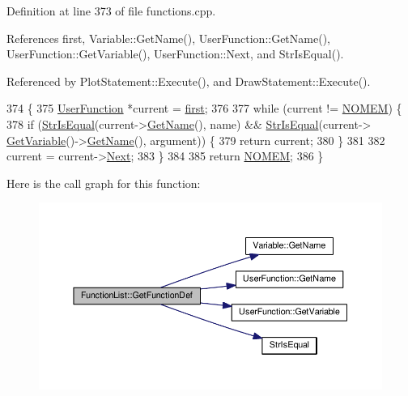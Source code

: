 Definition at line 373 of file functions.\+cpp.



References first, Variable\+::\+Get\+Name(), User\+Function\+::\+Get\+Name(), User\+Function\+::\+Get\+Variable(), User\+Function\+::\+Next, and Str\+Is\+Equal().



Referenced by Plot\+Statement\+::\+Execute(), and Draw\+Statement\+::\+Execute().


\begin{DoxyCode}
374 \{
375     \hyperlink{classUserFunction}{UserFunction} *current = \hyperlink{classFunctionList_a4a0534f4240022c58c3e06234e7f9f99}{first};
376 
377     \textcolor{keywordflow}{while} (current != \hyperlink{platform_8h_a46ff2bfbf0d44b8466a2251d5bd5e6f8}{NOMEM}) \{
378         \textcolor{keywordflow}{if} (\hyperlink{clib_8h_a2a1f39d11cbbaac992d42e67557dac4b}{StrIsEqual}(current->\hyperlink{classUserFunction_a59c59ebf5b45c5bb4aaa200a1218549d}{GetName}(), name) && \hyperlink{clib_8h_a2a1f39d11cbbaac992d42e67557dac4b}{StrIsEqual}(current->
      \hyperlink{classUserFunction_a4580afdaa5124951a523de07f3c454a6}{GetVariable}()->\hyperlink{classVariable_accf221d35cec8a9707e84891b715fb6c}{GetName}(), argument)) \{
379             \textcolor{keywordflow}{return} current;
380         \}
381 
382         current = current->\hyperlink{classUserFunction_a5463f575d2ed50c0dbe069ec2841a5c9}{Next};
383     \}
384 
385     \textcolor{keywordflow}{return} \hyperlink{platform_8h_a46ff2bfbf0d44b8466a2251d5bd5e6f8}{NOMEM};
386 \}
\end{DoxyCode}


Here is the call graph for this function\+:\nopagebreak
\begin{figure}[H]
\begin{center}
\leavevmode
\includegraphics[width=350pt]{classFunctionList_a867e5afb83ce8d6ee658290a76f54614_cgraph}
\end{center}
\end{figure}




